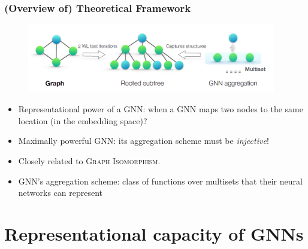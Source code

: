\documentclass{beamer}
\begin{document}
\begin{frame}
\frametitle{(Overview of) Theoretical Framework}

\begin{figure}[hbt]
	\includegraphics[height=3cm]{fig2.png}
\end{figure}

\begin{itemize}
    \item Representational power of a GNN: when a GNN maps two nodes to the same location (in the embedding space)? \pause
    
    \item Maximally powerful GNN: its aggregation scheme must be {\it injective}! \pause
    
    \item Closely related to \textsc{Graph Isomorphism}. \pause
    
    \item GNN's aggregation scheme: class of functions over multisets that their neural networks can represent
\end{itemize}
\end{frame}


\section{Representational capacity of GNNs}
\end{document}
